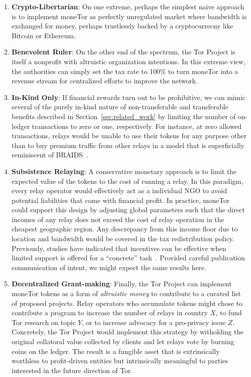 \begin{enumerate}

\item \textbf{Crypto-Libertarian}: On one extreme, perhaps the simplest naive
approach is to implement moneTor as perfectly unregulated market where bandwidth
is exchanged for money, perhaps trustlessly backed by a cryptocurrecny like
Bitcoin or Ethereum.

\item \textbf{Benevolent Ruler}: On the other end of the spectrum, the Tor
Project is itself a nonprofit with altruistic organization intentions. In this
extreme view, the authorities can simply set the tax rate to 100\% to turn
moneTor into a revenue stream for centralized efforts to improve the network.

\item \textbf{In-Kind Only}: If financial rewards turn out to be prohibitive, we can
mimic several of the purely in-kind nature of non-transferable and transferable
benefits described in Section~\ref{sec:related_work} by limiting the number of
on-ledger transactions to zero or one, respectively. For instance, at zero
allowed transactions, relays would be unable to use their tokens for any purpose
other than to buy premium traffic from other relays in a model that is
superficially reminiscent of BRAIDS~\cite{jansen2010recruiting}.

\item \textbf{Subsistence Relaying}: A conservative monetary approach is to limit the
expected value of the tokens to the cost of running a relay. In this paradigm,
every relay operator would effectively act as a individual NGO to avoid
potential liabilities that come with financial profit. In practice, moneTor
could support this design by adjusting global parameters such that the direct
incomes of any relay does not exceed the cost of relay operation in the cheapest
geographic region. Any descrepancy from this income floor due to location and
bandwidth would be covered in the tax redistribution policy. Previously, studies
have indicated that incentives can be effective when limited support is offered
for a ``concrete'' task~\cite{10.1257/jep.25.4.191, 10.1086/431263}. Provided
careful publication communication of intent, we might expect the same results
here.

\item \textbf{Decentralized Grant-making}: Finally, the Tor Project can
implement moneTor tokens as a form of \emph{altruistic money} to contribute to a
curated list of proposed projects. Relay operators who accumulate tokens might
chose to contribute a program to increase the number of relays in country $X$,
to fund Tor research on topic $Y$, or to increase advocacy for a pro-privacy
issue $Z$. Concretely, the Tor Project would implement this strategy by
witholding the original collatoral value collected by clients and let relays
vote by burning coins on the ledger. The result is a fungible asset that is
extrinsically worthless to profit-driven entities but intrinsically meaningful
to parties interested in the future direction of Tor.

\end{enumerate}

